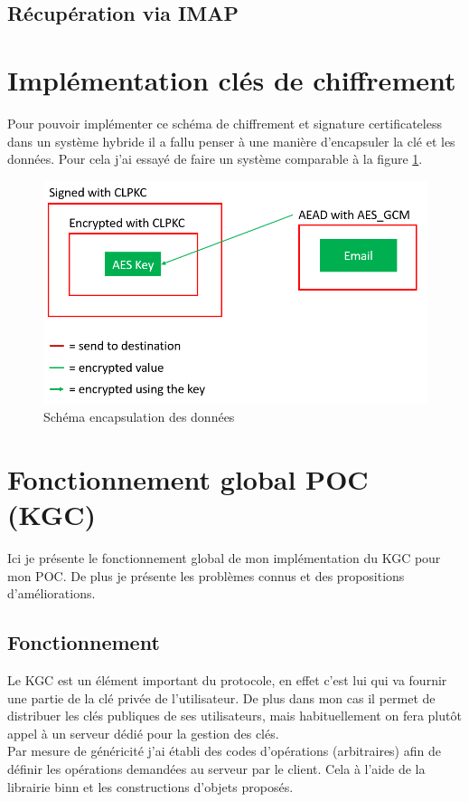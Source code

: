 \subsection{Récupération via IMAP}
\section{Implémentation clés  de chiffrement}
Pour pouvoir implémenter ce schéma de chiffrement et signature certificateless dans un système hybride il a fallu penser à une manière d'encapsuler la clé et les données. Pour cela j'ai essayé de faire un système comparable à la figure \ref{fig:encapsulate}. 
\begin{figure}[h!]
	\centering
	\includegraphics[width=12cm]{images/schemaEncapsulation.png}
	\caption{Schéma encapsulation des données}
	\label{fig:encapsulate}
\end{figure}

\section{Fonctionnement global POC (KGC)}
Ici je présente le fonctionnement global de mon implémentation du KGC pour mon POC. De plus je présente les problèmes connus et des propositions d'améliorations.
\subsection{Fonctionnement}
Le KGC est un élément important du protocole, en effet c'est lui qui va fournir une partie de la clé privée de l'utilisateur. De plus dans mon cas il permet de distribuer les clés publiques de ses utilisateurs, mais habituellement on fera plutôt appel à un serveur dédié pour la gestion des clés.\\
Par mesure de généricité j'ai établi des codes d'opérations (arbitraires) afin de définir les opérations demandées au serveur par le client. Cela à l'aide de la librairie binn et les constructions d'objets proposés.\\
